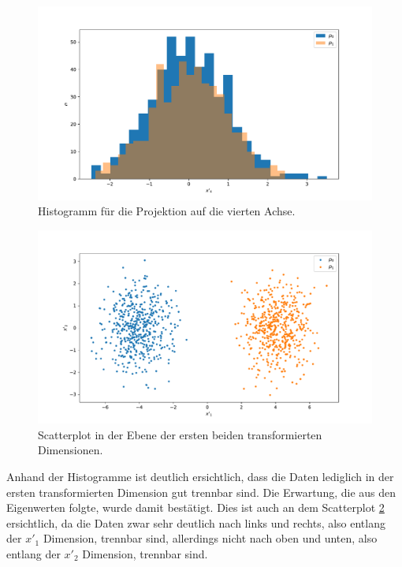 \documentclass[a4paper, 11pt]{article}
\begin{document}
\begin{figure}
    \centering
    \includegraphics[width=\textwidth]{../A18/A18_hist_4.pdf}
    \caption{Histogramm für die Projektion auf die vierten Achse.}
    \label{fig:A18_hist_4}
\end{figure}
\begin{figure}
    \centering
    \includegraphics[width=\textwidth]{../A18/A18_transformed_scatter.pdf}
    \caption{Scatterplot in der Ebene der ersten beiden transformierten Dimensionen.}
    \label{fig:A18_transformed_scatter}
\end{figure}
\FloatBarrier
Anhand der Histogramme ist deutlich ersichtlich, dass die Daten lediglich in der ersten transformierten Dimension gut trennbar sind.
Die Erwartung, die aus den Eigenwerten folgte, wurde damit bestätigt.
Dies ist auch an dem Scatterplot \ref{fig:A18_transformed_scatter} ersichtlich, da die Daten zwar sehr deutlich nach links und rechts, also entlang der $x'_1$ Dimension, trennbar sind, allerdings nicht nach oben und unten, also entlang der $x'_2$ Dimension, trennbar sind.
\end{document}
